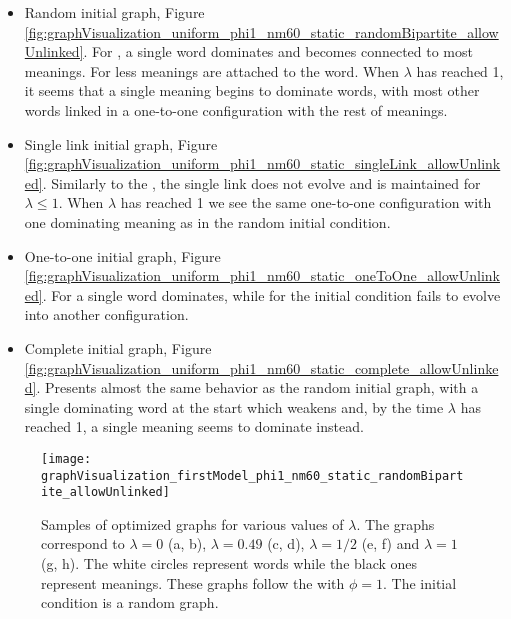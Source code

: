 \begin{redenv}
  \begin{itemize}
  \item Random initial graph, Figure \ref{fig:graphVisualization_uniform_phi1_nm60_static_randomBipartite_allowUnlinked}.
    For \lambdaZeroToHalf{}, a single word dominates and becomes connected to most meanings.
    For \lambdaHalfToOne{} less meanings are attached to the word.
    When $\lambda$ has reached 1, it seems that a single meaning begins to dominate words, with most other words linked in a one-to-one configuration with the rest of meanings.
  \item Single link initial graph, Figure \ref{fig:graphVisualization_uniform_phi1_nm60_static_singleLink_allowUnlinked}.
    Similarly to the \firstmodel{}, the single link does not evolve and is maintained for $\lambda \leq 1$.
    When $\lambda$ has reached 1 we see the same one-to-one configuration with one dominating meaning as in the random initial condition.
  \item One-to-one initial graph, Figure \ref{fig:graphVisualization_uniform_phi1_nm60_static_oneToOne_allowUnlinked}.
    For \lambdaZeroToHalf{} a single word dominates, while for \lambdaHalfToOne{} the initial condition fails to evolve into another configuration.
  \item Complete initial graph, Figure \ref{fig:graphVisualization_uniform_phi1_nm60_static_complete_allowUnlinked}.
    Presents almost the same behavior as the random initial graph, with a single dominating word at the start which weakens and, by the time $\lambda$ has reached 1, a single meaning seems to dominate instead.
  \end{itemize}
\end{redenv}

\begin{figure}
  \centering
  \texttt{[image: graphVisualization\_firstModel\_phi1\_nm60\_static\_randomBipartite\_allowUnlinked]}
  \caption{
    Samples of optimized graphs for various values of $\lambda$.
    The graphs correspond to $\lambda=0$ (a, b), $\lambda=0.49$ (c, d), $\lambda=1/2$ (e, f) and $\lambda=1$ (g, h).
    The white circles represent words while the black ones represent meanings.
    These graphs follow the \firstmodel{} with $\phi=1$.
    The initial condition is a random graph.
  }
  \label{fig:graphVisualization_firstModel_phi1_nm60_static_randomBipartite_allowUnlinked}
\end{figure}

